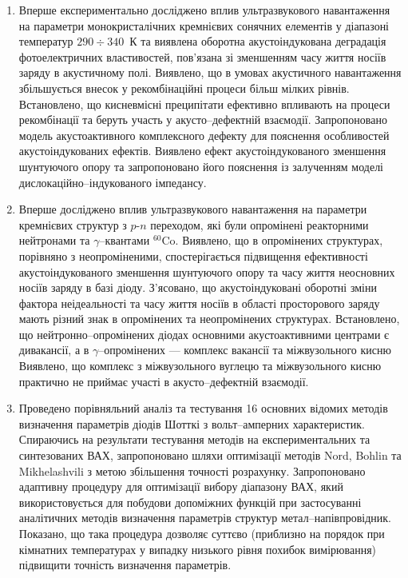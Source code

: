 \begin{enumerate}[leftmargin=0cm,itemindent=3em]
  \item Вперше експериментально досліджено вплив ультразвукового навантаження на параметри монокристалічних кремнієвих сонячних елементів у діапазоні температур $290\div340$~К
  та виявлена оборотна акустоіндукована деградація фотоелектричних властивостей, пов'язана зі зменшенням часу життя носіїв заряду в акустичному полі.
  Виявлено, що в умовах акустичного навантаження збільшується внесок у рекомбінаційні процеси більш мілких рівнів.
  Встановлено, що кисневмісні преципітати ефективно впливають на процеси рекомбінації та беруть участь у акусто--дефектній взаємодії.
  Запропоновано модель акустоактивного комплексного дефекту для пояснення особливостей акустоіндукованих ефектів.
 Виявлено ефект акустоіндукованого зменшення шунтуючого опору та запропоновано його пояснення із залученням моделі дислокаційно--індукованого імпедансу.

\item Вперше досліджено вплив ультразвукового навантаження на параметри кремнієвих структур з $p$-$n$ переходом, які були опромінені реакторними нейтронами та $\gamma$--квантами $^{60}$Co.
      Виявлено, що в опромінених структурах, порівняно з неопроміненими, спостерігається підвищення ефективності акустоіндукованого зменшення шунтуючого опору та часу життя неосновних носіїв заряду в базі діоду.
      З'ясовано, що акустоіндуковані оборотні зміни фактора неідеальності та часу життя носіїв в області просторового заряду   мають різний знак в опромінених та неопромінених структурах.
      Встановлено, що нейтронно--опромінених діодах основними акустоактивними центрами є дивакансії,
      а в $\gamma$--опромінених --- комплекс вакансії та міжвузольного кисню
     Виявлено, що комплекс з міжвузольного вуглецю та міжвузольного кисню практично не приймає участі в акусто--дефектній взаємодії.

\item  Проведено порівняльний аналіз та тестування 16 основних відомих методів визначення параметрів діодів Шотткі з вольт--амперних характеристик.
         Спираючись на результати тестування методів на експериментальних та синтезованих  ВАХ,
         запропоновано шляхи оптимізації методів Nord, Bohlin та Mikhelashvili з метою збільшення точності розрахунку.
      Запропоновано адаптивну процедуру для оптимізації вибору діапазону ВАХ, який використовується для побудови допоміжних функцій при застосуванні аналітичних методів визначення параметрів структур метал--напівпровідник.
       Показано, що така процедура дозволяє суттєво (приблизно на порядок при кімнатних температурах у випадку низького рівня похибок вимірювання) підвищити точність визначення параметрів.


\end{enumerate}
